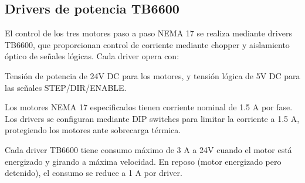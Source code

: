 \subsection{Drivers de potencia TB6600}

El control de los tres motores paso a paso NEMA 17 se realiza mediante drivers TB6600, que proporcionan control de corriente mediante chopper y aislamiento óptico de señales lógicas. Cada driver opera con:

Tensión de potencia de 24V DC para los motores, y tensión lógica de 5V DC para las señales STEP/DIR/ENABLE. 

Los motores NEMA 17 especificados tienen corriente nominal de 1.5 A por fase. Los drivers se configuran mediante DIP switches para limitar la corriente a 1.5 A, protegiendo los motores ante sobrecarga térmica.

Cada driver TB6600 tiene consumo máximo de 3 A a 24V cuando el motor está energizado y girando a máxima velocidad. En reposo (motor energizado pero detenido), el consumo se reduce a 1 A por driver.
